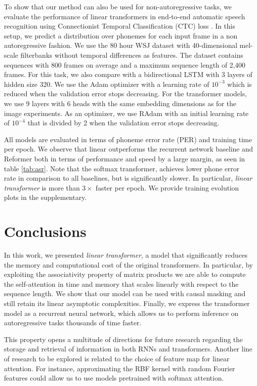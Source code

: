\egroup

To show that our method can also be used for non-autoregressive tasks, we evaluate the performance of linear transformers in end-to-end automatic speech recognition using Connectionist Temporal Classification (CTC) loss \cite{graves2006connectionist}. In this setup, we predict a distribution over phonemes for each input frame in a non autoregressive fashion. We use the 80 hour WSJ dataset \cite{paul1992design} with 40-dimensional mel-scale filterbanks without temporal differences as features. The dataset contains sequences with 800 frames on average and a maximum sequence length of 2,400 frames. For this task, we also compare with a bidirectional LSTM \cite{hochreiter1997long} with 3 layers of hidden size 320. We use the Adam optimizer \cite{kingma2014adam} with a learning rate of $10^{-3}$ which is reduced when the validation error stops decreasing. For the transformer models, we use 9 layers with 6 heads with the same embedding dimensions as for the image experiments. As an optimizer, we use RAdam with an initial learning rate of $10^{-4}$ that is divided by 2 when the validation error stops decreasing.

All models are evaluated in terms of phoneme error rate (PER) and training time per epoch. We observe that linear outperforms the recurrent network baseline and Reformer both in terms of performance and speed by a large margin, as seen in table \ref{tab:asr}. Note that the softmax transformer, achieves lower phone error rate in comparison to all baselines, but is significantly slower. In particular, \emph{linear transformer} is more than $3 \times$ faster per epoch. We provide training evolution plots in the supplementary.

\section{Conclusions}

In this work, we presented \emph{linear transformer}, a model that significantly reduces the memory and computational cost of the original transformers. In particular, by exploiting the associativity property of matrix products we are able to compute the self-attention in time and memory that scales linearly with respect to the sequence length. We show that our model can be used with causal masking and still retain its linear asymptotic complexities. Finally, we express the transformer model as a recurrent neural network, which allows us to perform inference on autoregressive tasks thousands of time faster.

This property opens a multitude of directions for future research regarding the storage and retrieval of information in both RNNs and transformers. Another line of research to be explored is related to the choice of feature map for linear attention. For instance, approximating the RBF kernel with random Fourier features could allow us to use models pretrained with softmax attention.


